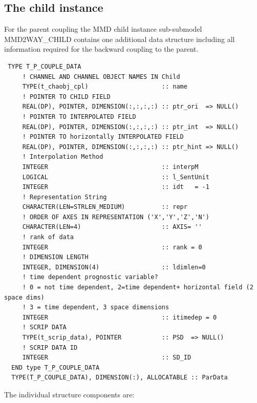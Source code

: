 \documentclass[11pt,twoside]{article}
\begin{document}
\subsection{The child instance}
For the parent coupling the MMD child instance sub-submodel MMD2WAY\_CHILD
contains one additional data structure including all information required for 
the backward coupling to the parent.
\begin{verbatim}
 TYPE T_P_COUPLE_DATA
     ! CHANNEL AND CHANNEL OBJECT NAMES IN Child
     TYPE(t_chaobj_cpl)                    :: name
     ! POINTER TO CHILD FIELD
     REAL(DP), POINTER, DIMENSION(:,:,:,:) :: ptr_ori  => NULL()
     ! POINTER TO INTERPOLATED FIELD
     REAL(DP), POINTER, DIMENSION(:,:,:,:) :: ptr_int  => NULL()
     ! POINTER TO horizontally INTERPOLATED FIELD
     REAL(DP), POINTER, DIMENSION(:,:,:,:) :: ptr_hint => NULL()
     ! Interpolation Method
     INTEGER                               :: interpM
     LOGICAL                               :: l_SentUnit
     INTEGER                               :: idt   = -1
     ! Representation String
     CHARACTER(LEN=STRLEN_MEDIUM)          :: repr
     ! ORDER OF AXES IN REPRESENTATION ('X','Y','Z','N')
     CHARACTER(LEN=4)                      :: AXIS= '' 
     ! rank of data
     INTEGER                               :: rank = 0
     ! DIMENSION LENGTH
     INTEGER, DIMENSION(4)                 :: ldimlen=0 
     ! time dependent prognostic variable?
     ! 0 = not time dependent, 2=time dependent+ horizontal field (2 space dims)
     ! 3 = time dependent, 3 space dimensions
     INTEGER                               :: itimedep = 0
     ! SCRIP DATA
     TYPE(t_scrip_data), POINTER           :: PSD  => NULL()
     ! SCRIP DATA ID
     INTEGER                               :: SD_ID
  END type T_P_COUPLE_DATA
  TYPE(T_P_COUPLE_DATA), DIMENSION(:), ALLOCATABLE :: ParData
\end{verbatim}
The individual structure components are: 
\end{document}
